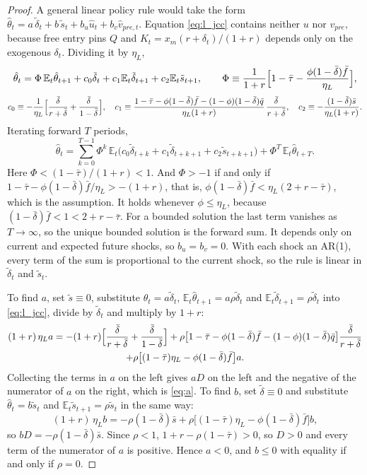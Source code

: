\documentclass[authoryear, review, 12pt]{elsarticle}
\begin{document}
\begin{proof}
A general linear policy rule would take the form
$\hat\theta_t=a\,\tilde\delta_t+b\,\tilde s_t+b_u\hat u_t+b_v\hat v_{pre,t}$. Equation
\eqref{eq:l_jcc} contains neither $u$ nor $v_{pre}$, because free entry pins $Q$ and
$K_t=x_m(r+\delta_t)/(1+r)$ depends only on the exogenous $\delta_t$. Dividing it by
$\eta_L$,
\[
	\hat\theta_t=\Phi\,\mathbb{E}_t\hat\theta_{t+1}+c_0\tilde\delta_t+c_1\mathbb{E}_t\tilde\delta_{t+1}
	+c_2\mathbb{E}_t\tilde s_{t+1},
	\qquad
	\Phi\equiv\frac{1}{1+r}\Bigl[1-\bar\tau-\frac{\phi(1-\bar\delta)\bar f}{\eta_L}\Bigr],
\]
\[
	c_0\equiv-\frac{1}{\eta_L}\Bigl[\frac{\bar\delta}{r+\bar\delta}+\frac{\bar\delta}{1-\bar\delta}\Bigr],
	\quad
	c_1\equiv\frac{1-\bar\tau-\phi(1-\bar\delta)\bar f-(1-\phi)(1-\bar\delta)\bar q}{\eta_L(1+r)}\,
	\frac{\bar\delta}{r+\bar\delta},
	\quad
	c_2\equiv-\frac{(1-\bar\delta)\bar s}{\eta_L(1+r)}.
\]
Iterating forward $T$ periods,
\[
	\hat\theta_t=\sum_{k=0}^{T-1}\Phi^k\,\mathbb{E}_t\bigl(c_0\tilde\delta_{t+k}+c_1\tilde\delta_{t+k+1}
	+c_2\tilde s_{t+k+1}\bigr)+\Phi^T\,\mathbb{E}_t\hat\theta_{t+T}.
\]
Here $\Phi<(1-\bar\tau)/(1+r)<1$. And $\Phi>-1$ if and only if
$1-\bar\tau-\phi(1-\bar\delta)\bar f/\eta_L>-(1+r)$, that is,
$\phi(1-\bar\delta)\bar f<\eta_L(2+r-\bar\tau)$, which is the assumption. It holds whenever
$\phi\le\eta_L$, because $(1-\bar\delta)\bar f<1<2+r-\bar\tau$. For a bounded solution the
last term vanishes as $T\to\infty$, so the unique bounded solution is the forward sum. It
depends only on current and expected future shocks, so $b_u=b_v=0$. With each shock an
AR(1), every term of the sum is proportional to the current shock, so the rule is linear
in $\tilde\delta_t$ and $\tilde s_t$.

To find $a$, set $\tilde s\equiv0$, substitute $\hat\theta_t=a\tilde\delta_t$,
$\mathbb{E}_t\hat\theta_{t+1}=a\rho\tilde\delta_t$ and
$\mathbb{E}_t\tilde\delta_{t+1}=\rho\tilde\delta_t$ into \eqref{eq:l_jcc}, divide by
$\tilde\delta_t$ and multiply by $1+r$:
\begin{multline*}
	(1+r)\,\eta_L a=-(1+r)\Bigl[\frac{\bar\delta}{r+\bar\delta}+\frac{\bar\delta}{1-\bar\delta}\Bigr]
	+\rho\bigl[1-\bar\tau-\phi(1-\bar\delta)\bar f-(1-\phi)(1-\bar\delta)\bar q\bigr]\frac{\bar\delta}{r+\bar\delta}\\
	+\rho\bigl[(1-\bar\tau)\eta_L-\phi(1-\bar\delta)\bar f\bigr]a .
\end{multline*}
Collecting the terms in $a$ on the left gives $aD$ on the left and the negative of the
numerator of $a$ on the right, which is \eqref{eq:a}. To find $b$, set
$\tilde\delta\equiv0$ and substitute $\hat\theta_t=b\tilde s_t$ and
$\mathbb{E}_t\tilde s_{t+1}=\rho\tilde s_t$ in the same way:
\[
	(1+r)\,\eta_L b=-\rho(1-\bar\delta)\bar s+\rho\bigl[(1-\bar\tau)\eta_L-\phi(1-\bar\delta)\bar f\bigr]b,
\]
so $bD=-\rho(1-\bar\delta)\bar s$. Since $\rho<1$, $1+r-\rho(1-\bar\tau)>0$, so $D>0$ and every
term of the numerator of $a$ is positive. Hence $a<0$, and $b\le0$ with equality if and only
if $\rho=0$.
\end{proof}
\end{document}
